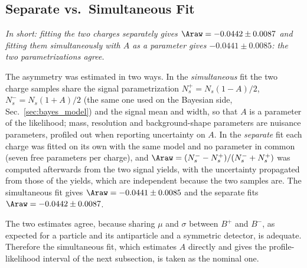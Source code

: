 \subsection{Separate vs.\ Simultaneous Fit}
\label{sec:freq_simfit}
\emph{In short: fitting the two charges separately gives $\Araw=-0.0442\pm0.0087$ and fitting them simultaneously with $A$ as a parameter gives $-0.0441\pm0.0085$: the two parametrizations agree.}

The asymmetry was estimated in two ways. In the \emph{simultaneous} fit the two charge samples share the signal parametrization $N_s^+=N_s(1-A)/2$, $N_s^-=N_s(1+A)/2$ (the same one used on the Bayesian side, Sec.~\ref{sec:bayes_model}) and the signal mean and width, so that $A$ is a parameter of the likelihood; mass, resolution and background-shape parameters are nuisance parameters, profiled out when reporting uncertainty on $A$. In the \emph{separate} fit each charge was fitted on its own with the same model and no parameter in common (seven free parameters per charge), and $\Araw=(N_s^--N_s^+)/(N_s^-+N_s^+)$ was computed afterwards from the two signal yields, with the uncertainty propagated from those of the yields, which are independent because the two samples are. The simultaneous fit gives $\Araw=-0.0441\pm0.0085$ and the separate fits $\Araw=-0.0442\pm0.0087$.

The two estimates agree, because sharing $\mu$ and $\sigma$ between $B^+$ and $B^-$, as expected for a particle and its antiparticle and a symmetric detector, is adequate.
Therefore the simultaneous fit, which estimates $A$ directly and gives the profile-likelihood interval of the next subsection, is taken as the nominal one.

